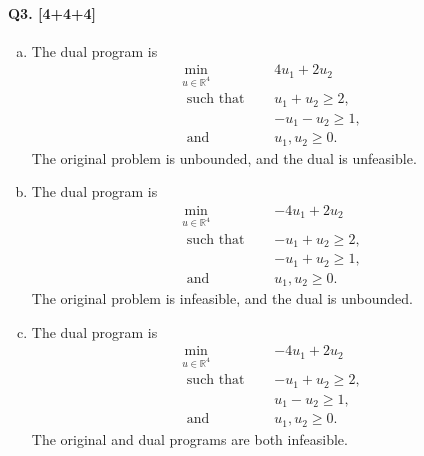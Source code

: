 \documentclass[11pt]{article}
\newcommand{\R}{\mathbb{R}}
\begin{document}
\paragraph{Q3. [4+4+4]}
\begin{enumerate}[(a)]
\item The dual program is
\begin{align*}
\min_{u \in \R^4} \quad &   4u_1 + 2u_2         \\
\mbox{ such that } \quad
                        &   u_1 + u_2   \geq 2, \\
                        &   -u_1 - u_2  \geq 1, \\
\mbox{ and } \quad
                        &   u_1, u_2    \geq 0.
\end{align*}
The original problem is unbounded, and the dual is unfeasible.
 
\item The dual program is
\begin{align*}
\min_{u \in \R^4} \quad &   -4u_1 + 2u_2        \\
\mbox{ such that } \quad
                        &   -u_1 + u_2  \geq 2, \\
                        &   -u_1 + u_2  \geq 1, \\
\mbox{ and } \quad
                        &   u_1, u_2    \geq 0.
\end{align*}
The original problem is infeasible, and the dual is unbounded.
 
\item The dual program is
\begin{align*}
\min_{u \in \R^4} \quad &   -4u_1 + 2u_2        \\
\mbox{ such that } \quad
                        &   -u_1 + u_2  \geq 2, \\
                        &   u_1 - u_2   \geq 1, \\
\mbox{ and } \quad
                        &   u_1, u_2    \geq 0.
\end{align*}
The original and dual programs are both infeasible.
 
\end{enumerate}
\end{document}
